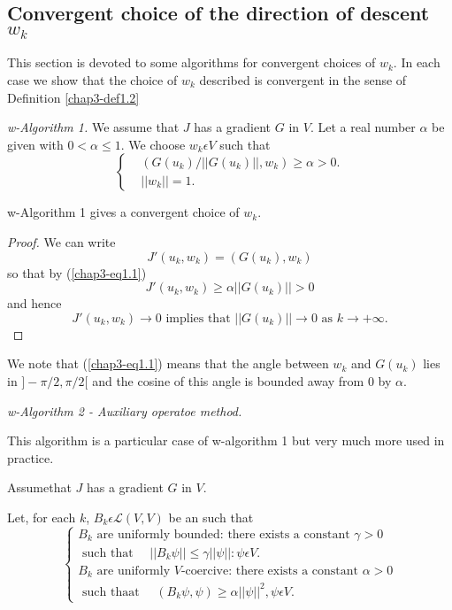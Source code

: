 \subsection{Convergent choice of the direction of descent $w_{k}$}\label{chap3-subsec1.2}

This section is devoted to some algorithms for convergent choices of $w_{k}$. In each case  we show that the choice of $w_{k}$ described is convergent in the sense of Definition \ref{chap3-def1.2}

{\em w-Algorithm 1.} We assume that $J$ has a gradient $G$ in $V$. Let a real number $\alpha$ be given with $0 < \alpha \leq 1$. We choose $w_{k} \epsilon V$ such that
\begin{equation*}
\begin{cases}
& (G(u_{k})/||G(u_{k})||, w_{k}) \geq \alpha > 0.\\
& ||w_{k}|| = 1.\tag{1.1}\label{chap3-eq1.1}
\end{cases}
\end{equation*}

\begin{proposition}\label{chap3-prop1.1}
w-Algorithm 1 gives a convergent choice of $w_{k}$.
\end{proposition}

\begin{proof}
We can write
$$
J'(u_{k}, w_{k}) = (G(u_{k}), w_{k})
$$
so that by (\ref{chap3-eq1.1})
$$
J'(u_{k}, w_{k}) \geq \alpha ||G(u_{k})|| > 0
$$
and hence
$$
J'(u_{k}, w_{k}) \to 0 \text{ implies that } ||G(u_{k})|| \to 0 \text{ as } k \to + \infty.
$$
\end{proof}

We note that (\ref{chap3-eq1.1}) means that the angle between $w_{k}$ and $G(u_{k})$ lies in $]-\pi/2, \pi/2[$ and the cosine of this angle is bounded away from 0 by $\alpha$.

{\em w-Algorithm 2 - Auxiliary operatoe method.}

This algorithm is a particular case of w-algorithm 1 but very much more used in practice.

Assume\pageoriginale that $J$ has a gradient $G$ in $V$.

Let, for each $k$, $B_{k} \epsilon \mathscr{L} (V, V)$ be an such that
\begin{equation*}
\begin{cases}
 B_{k} \text{ are uniformly bounded: there exists a constant } \gamma > 0\\ 
\text{ such that }\quad||B_{k} \psi|| \leq \gamma ||\psi|| : \psi \epsilon V.\\
B_{k} \text{ are uniformly $V$-coercive: there exists a constant }
\alpha > 0\\ 
\text{ such thaat } \quad 
(B_{k} \psi, \psi) \geq \alpha ||\psi||^{2}, \psi \epsilon V.\tag{1.2}\label{chap3-eq1.2}
\end{cases}
\end{equation*}

